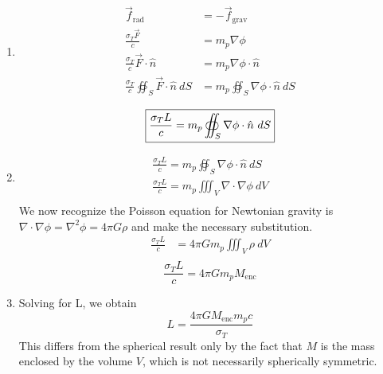 \documentclass{article}
\begin{document}
\section{}

\begin{enumerate}[label=\alph*.]
\item
\begin{equation*}
    \begin{split}
        \vec{f}_{\mathrm{rad}} &= -\vec{f}_{\mathrm{grav}}\\
        \frac{\sigma_T \vec{F}}{c} &= m_p \nabla \phi\\
        \frac{\sigma_T}{c}\vec{F}\cdot \hat{n} &= m_p \nabla \phi \cdot \hat{n}\\
        \frac{\sigma_T}{c} \oiint_S \vec{F}\cdot \hat{n} \ dS &= m_p \oiint_S \nabla \phi \cdot \hat{n} \ dS\\
    \end{split}
\end{equation*}
\begin{equation}
    \boxed{\frac{\sigma_T L}{c} = m_p \oiint_S \nabla \phi \cdot \hat{n} \ dS\\}
\end{equation}
%
\item
\begin{equation*}
    \begin{split}
        \frac{\sigma_T L}{c} = m_p \oiint_S \nabla \phi \cdot \hat{n} \ dS\\
        \frac{\sigma_T L}{c} = m_p \iiint_V \nabla \cdot \nabla \phi \ dV\\
    \end{split}
\end{equation*}
We now recognize the Poisson equation for Newtonian gravity is $\nabla \cdot \nabla \phi = \nabla^2\phi = 4\pi G\rho$ and make the necessary substitution.
\begin{equation*}
    \begin{split}
        \frac{\sigma_T L}{c} &= 4\pi G m_p \iiint_V \rho \ dV\\
    \end{split}
\end{equation*}
\begin{equation}
    \boxed{\frac{\sigma_T L}{c} = 4\pi G m_p M_{\mathrm{enc}}}
\end{equation}
%
\item
Solving for L, we obtain
\begin{equation}
    \boxed{L = \frac{4\pi G M_{\mathrm{enc}} m_p c}{\sigma_T}}
\end{equation}
This differs from the spherical result only by the fact that $M$ is the mass enclosed by the volume $V$, which is not necessarily spherically symmetric.
\end{enumerate}
\end{document}

